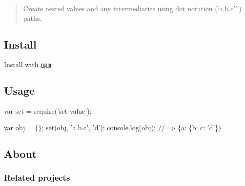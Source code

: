 \begin{quote}
Create nested values and any intermediaries using dot notation (`\textquotesingle{}a.\+b.\+c'\`{}) paths. \end{quote}


\subsection*{Install}

Install with \href{https://www.npmjs.com/}{\tt npm}\+:




\subsection*{Usage}


\begin{DoxyCode}
var set = require('set-value');

var obj = \{\};
set(obj, 'a.b.c', 'd');
console.log(obj);
//=> \{a: \{b: c: 'd'\}\}
\end{DoxyCode}


\subsection*{About}

\subsubsection*{Related projects}



